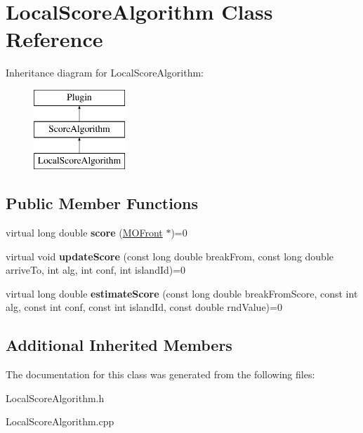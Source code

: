 \hypertarget{classLocalScoreAlgorithm}{}\section{Local\+Score\+Algorithm Class Reference}
\label{classLocalScoreAlgorithm}
Inheritance diagram for Local\+Score\+Algorithm\+:\begin{figure}[H]
\begin{center}
\leavevmode
\includegraphics[height=3.000000cm]{d9/db8/classLocalScoreAlgorithm}
\end{center}
\end{figure}
\subsection*{Public Member Functions}
\begin{DoxyCompactItemize}
\item 
\mbox{\label{classLocalScoreAlgorithm_a16f56a8b9b2dc36c8b82865327433f4c}} 
virtual long double {\bfseries score} (\mbox{\hyperlink{classMOFront}{M\+O\+Front}} $\ast$)=0
\item 
\mbox{\label{classLocalScoreAlgorithm_a06854361c6bcfa18fe9ac1bf6c6f62d0}} 
virtual void {\bfseries update\+Score} (const long double break\+From, const long double arrive\+To, int alg, int conf, int island\+Id)=0
\item 
\mbox{\label{classLocalScoreAlgorithm_a836a125f777298457ee9ae43c990b3fb}} 
virtual long double {\bfseries estimate\+Score} (const long double break\+From\+Score, const int alg, const int conf, const int island\+Id, const double rnd\+Value)=0
\end{DoxyCompactItemize}
\subsection*{Additional Inherited Members}


The documentation for this class was generated from the following files\+:\begin{DoxyCompactItemize}
\item 
Local\+Score\+Algorithm.\+h\item 
Local\+Score\+Algorithm.\+cpp\end{DoxyCompactItemize}
